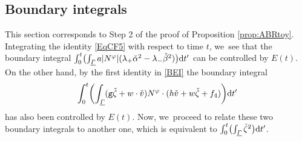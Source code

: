 \documentclass[JEP,XML,SOM,Unicode,NoFloatCountersInSection,published]{cedram}
\newcommand{\gr}{{\mathtt g}}
\newcommand{\ul}[1]{\underline{#1}}
\newcommand{\itGamma}{\mathit{\Gamma}}
\theoremstyle{definition}
\begin{document}
\subsection{Boundary integrals}
This section corresponds to Step 2 of the proof of Proposition \ref{prop:ABRtoy}.
Integrating the identity \eqref{EqCF5} with respect to time $t$, we~see that the boundary integral
$\int_0^t \bigl(\int_{\ul{\itGamma}} a|N^\varphi|(\lambda_+\check{\alpha}^2-\lambda_-\check{\beta}^2) \bigr){\rm d}t'$ can be controlled by $E(t)$.
On the other hand, by the first identity in \eqref{BEI} the boundary integral
\[
\int_0^t\biggl(\int_{\ul{\itGamma}}(\gr\check{\zeta}+w\cdot\check{v})N^\varphi\cdot(h\check{v}+w\check{\zeta}+f_4) \biggr){\rm d}t'
\]
has also been controlled by $E(t)$.
Now, we~proceed to relate these two boundary integrals to another one, which is equivalent to
$\int_0^t \bigl(\int_{\ul{\itGamma}}\check{\zeta}^2 \bigr){\rm d}t'$.
\end{document}

